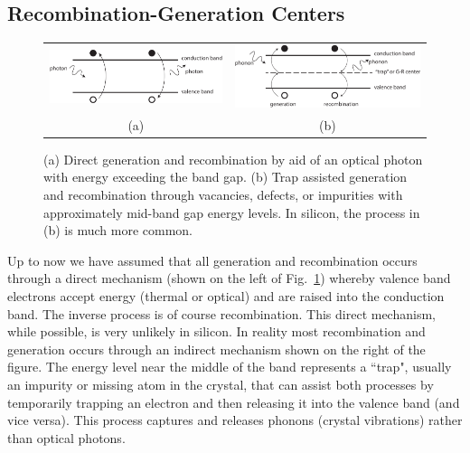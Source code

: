 \subsection{Recombination-Generation Centers}
\begin{figure}[tb]
\begin{center}
\begin{tabular}{cc}
\includegraphics[width=.5\columnwidth]{gr_direct} &
\includegraphics[width=.5\columnwidth]{gr_indirect} \\
(a) & (b) \\
\end{tabular}
\end{center}
\caption{(a) Direct generation and recombination by aid of an optical photon with energy exceeding the band gap.  (b)  Trap assisted generation and recombination through vacancies, defects, or impurities with approximately mid-band gap energy levels.  In silicon, the process in (b) is much more common. } \label{fig:gr_direct}
\end{figure}

Up to now we have assumed that all generation and recombination occurs through a direct mechanism (shown on the left of Fig.~\ref{fig:gr_direct}) whereby valence band electrons accept energy (thermal or optical) and are raised into the conduction band.  The inverse process is of course recombination. This direct mechanism, while possible, is very unlikely in silicon. In reality most recombination and generation occurs through an indirect mechanism shown on the right of the figure.  The energy level near the middle of the band represents a ``trap", usually an impurity or missing atom in the crystal, that can assist both processes by temporarily trapping an electron and then releasing it into the valence band (and vice versa). This process captures and releases phonons (crystal vibrations) rather than optical photons.
